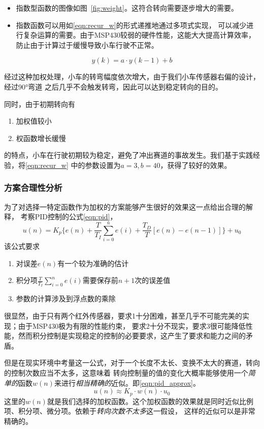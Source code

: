 \documentclass[a4paper,twoside,zihao=5,UTF8]{ctexart}
\begin{document}
\begin{spacing}{1.2}
\begin{itemize}
\item 指数型函数的图像如图~\ref{fig:weight}。这符合转向需要逐步增大的需要。
\item 指数函数可以用如\eqref{eqn:recur_w}的形式递推地通过多项式实现，
可以减少进行复杂运算的需要。由于MSP430较弱的硬件性能，这能大大提高计算效率，
防止由于计算过于缓慢导致小车行驶不正常。
\end{itemize}

\begin{equation}
	\label{eqn:recur_w}
	y(k)=a\cdot y(k-1)+b
\end{equation}

经过这种加权处理，小车的转弯幅度依次增大，由于我们小车传感器右偏的设计，经过90°弯道
之后几乎不会触发转弯，因此可以达到稳定转向的目的。

同时，由于初期转向有
\begin{enumerate}
	\item 加权值较小
	\item 权函数增长缓慢
\end{enumerate}
的特点，小车在行驶初期较为稳定，避免了冲出赛道的事故发生。我们基于实践经验，将\eqref{eqn:recur_w}
中的参数设置为$a=3,b=40$，获得了较好的效果。

\subsubsection{方案合理性分析}
为了对选择一特定函数作为加权的方案能够产生很好的效果这一点给出合理的解释，
考察PID控制的公式\eqref{eqn:pid}，
\begin{equation}
	\label{eqn:pid}
	u(n)=K_p\{e(n)+\frac{T}{T_I}\sum_{i=0}^ne(i)+\frac{T_D}{T}[e(n)-e(n-1)]\}+u_0
\end{equation}
该公式要求
\begin{enumerate}
	\item 对误差$e(n)$有一个较为准确的估计
	\item 积分项$\frac{T}{T_I}\sum_{i=0}^ne(i)$需要保存前$n+1$次的误差值
	\item 参数的计算涉及到浮点数的乘除
\end{enumerate}
很显然，由于只有两个红外传感器，要求1十分困难，甚至几乎不可能完美的实现；由于MSP430极为有限的性能约束，
要求2十分不现实，要求3很可能降低性能，然而积分控制是实现稳定的控制的必要要求，这产生了要求和能力之间的矛盾。

但是在现实环境中考量这一公式，对于一个长度不太长、变换不太大的赛道，转向的控制次数应当不太多，这意味着
转向控制量的值的变化大概率能够使用一个\emph{简单的}函数$w(n)$来进行\emph{相当精确的}近似。即\eqref{eqn:pid_approx}。
\begin{equation}
	\label{eqn:pid_approx}
	u(n)\approx K_p\cdot w(n)\cdot u_0
\end{equation}
这里的$w(n)$就是我们选择的加权函数。这个加权函数的效果就是同时近似比例项、积分项、微分项。依赖于\emph{转向次数不太多}这一假设，
这样的近似可以是非常精确的。


\end{spacing}
\end{document}

